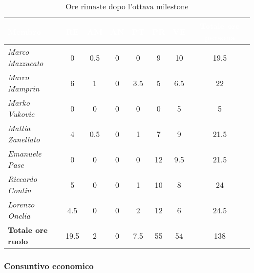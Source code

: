 \begin{table}[H]
    \renewcommand\arraystretch{1.5}
    \centering
    \begin{tabular}{|l|c|c|c|c|c|c|c|}
    \hline
    \rowcolor[HTML]{036400}
    \textcolor{white}{\textbf{Membro}} & \multicolumn{1}{c|}{\textcolor{white}{\textbf{RE}}} & \multicolumn{1}{c|}{\textcolor{white}{\textbf{AM}}} & \multicolumn{1}{c|}{\textcolor{white}{\textbf{AN}}} & \multicolumn{1}{c|}{\textcolor{white}{\textbf{PT}}} & \multicolumn{1}{c|}{\textcolor{white}{\textbf{PR}}} & \multicolumn{1}{c|}{\textcolor{white}{\textbf{VE}}} & \multicolumn{1}{c|}{\textcolor{white}{\textbf{Totale ore persona}}} \\ \hline
    \rowcolor[HTML]{EFEFEF}\textit{Marco Mazzucato}  & 0    & 0.5  & 0     & 0     & 9   & 10     & 19.5     \\ \hline
    \rowcolor[HTML]{C0C0C0}\textit{Marco Mamprin}    & 6    & 1    & 0     & 3.5   & 5   & 6.5    & 22     \\ \hline
    \rowcolor[HTML]{EFEFEF}\textit{Marko Vukovic}    & 0    & 0    & 0     & 0     & 0   & 5      & 5     \\ \hline
    \rowcolor[HTML]{C0C0C0}\textit{Mattia Zanellato} & 4    & 0.5  & 0     & 1     & 7   & 9      & 21.5     \\ \hline
    \rowcolor[HTML]{EFEFEF}\textit{Emanuele Pase}    & 0    & 0    & 0     & 0     & 12  & 9.5    & 21.5     \\ \hline
    \rowcolor[HTML]{C0C0C0}\textit{Riccardo Contin}  & 5    & 0    & 0     & 1     & 10  & 8      & 24     \\ \hline
    \rowcolor[HTML]{EFEFEF}\textit{Lorenzo Onelia}   & 4.5  & 0    & 0     & 2     & 12  & 6      & 24.5     \\ \hline
    \rowcolor[HTML]{C0C0C0}\textbf{Totale ore ruolo} & 19.5 & 2    & 0     & 7.5   & 55  & 54     & 138   \\ \hline
    \end{tabular}
    \caption{Ore rimaste dopo l'ottava milestone}
\end{table}

\subsubsection{Consuntivo economico}


